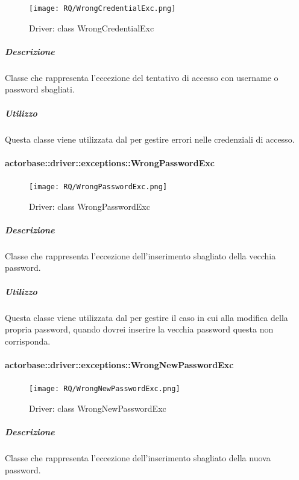 \documentclass{scalatekids-article}
\begin{document}
\begin{figure}[H]
  \begin{center}
    \texttt{[image: RQ/WrongCredentialExc.png]}
    \caption{Driver: class WrongCredentialExc}
  \end{center}
\end{figure}

\subparagraph{Descrizione}

Classe che rappresenta l'eccezione del tentativo di accesso con username o password sbagliati.

\subparagraph{Utilizzo}

Questa classe viene utilizzata dal  per gestire errori nelle credenziali di accesso.


\paragraph{actorbase::driver::exceptions::WrongPasswordExc}

\begin{figure}[H]
  \begin{center}
    \texttt{[image: RQ/WrongPasswordExc.png]}
    \caption{Driver: class WrongPasswordExc}
  \end{center}
\end{figure}

\subparagraph{Descrizione}

Classe che rappresenta l'eccezione dell'inserimento sbagliato della vecchia password.

\subparagraph{Utilizzo}

Questa classe viene utilizzata dal  per gestire il caso in cui alla modifica della propria password, quando dovrei inserire la vecchia password questa non corrisponda.

\paragraph{actorbase::driver::exceptions::WrongNewPasswordExc}

\begin{figure}[H]
  \begin{center}
    \texttt{[image: RQ/WrongNewPasswordExc.png]}
    \caption{Driver: class WrongNewPasswordExc}
  \end{center}
\end{figure}

\subparagraph{Descrizione}

Classe che rappresenta l'eccezione dell'inserimento sbagliato della nuova password.
\end{document}
